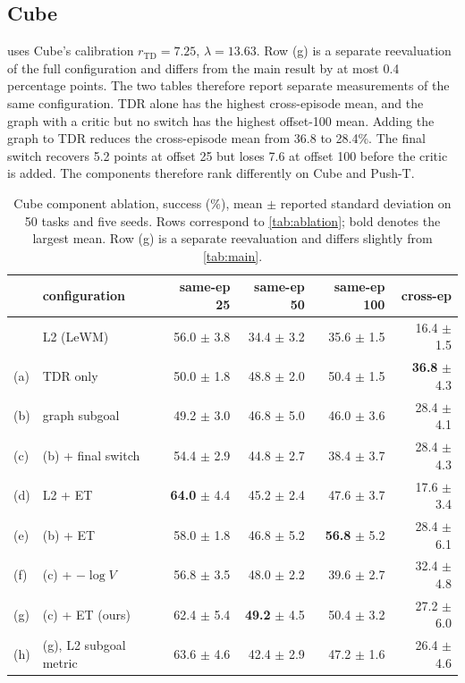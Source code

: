 \documentclass{article}
\newcommand{\Htd}{r_{\mathrm{TD}}}
\theoremstyle{definition}
\theoremstyle{remark}
\begin{document}
\subsection{Cube}
\label{app:ablation-cube}
 uses Cube's calibration
$\Htd=7.25$, $\lambda=13.63$. Row (g) is a separate reevaluation of the full
configuration and differs from the main result by at most 0.4 percentage points.
The two tables therefore report separate measurements of the same configuration.
TDR alone has the highest cross-episode mean, and the graph with a critic but no
switch has the highest offset-100 mean. Adding the graph to TDR reduces the
cross-episode mean from 36.8 to 28.4\%. The final switch recovers 5.2 points at
offset 25 but loses 7.6 at offset 100 before the critic is added.
The components therefore rank differently on Cube and Push-T.
\begin{table}[h]
\centering\small
\caption{Cube component ablation, success (\%), mean $\pm$ reported standard deviation on 50 tasks and five seeds. Rows correspond to \cref{tab:ablation}; bold denotes the largest mean. Row (g) is a separate reevaluation and differs slightly from \cref{tab:main}.}
\label{tab:ablation-cube}
\begin{tabular}{llrrrr}
\toprule
& configuration & same-ep 25 & same-ep 50 & same-ep 100 & cross-ep \\
\midrule
& L2 (LeWM) & 56.0 $\pm$ 3.8 & 34.4 $\pm$ 3.2 & 35.6 $\pm$ 1.5 & 16.4 $\pm$ 1.5 \\
(a) & TDR only & 50.0 $\pm$ 1.8 & 48.8 $\pm$ 2.0 & 50.4 $\pm$ 1.5 & \textbf{36.8} $\pm$ 4.3 \\
(b) & graph subgoal & 49.2 $\pm$ 3.0 & 46.8 $\pm$ 5.0 & 46.0 $\pm$ 3.6 & 28.4 $\pm$ 4.1 \\
(c) & (b) + final switch & 54.4 $\pm$ 2.9 & 44.8 $\pm$ 2.7 & 38.4 $\pm$ 3.7 & 28.4 $\pm$ 4.3 \\
\midrule
(d) & L2 + ET & \textbf{64.0} $\pm$ 4.4 & 45.2 $\pm$ 2.4 & 47.6 $\pm$ 3.7 & 17.6 $\pm$ 3.4 \\
(e) & (b) + ET & 58.0 $\pm$ 1.8 & 46.8 $\pm$ 5.2 & \textbf{56.8} $\pm$ 5.2 & 28.4 $\pm$ 6.1 \\
(f) & (c) + $-\log V$ & 56.8 $\pm$ 3.5 & 48.0 $\pm$ 2.2 & 39.6 $\pm$ 2.7 & 32.4 $\pm$ 4.8 \\
(g) & (c) + ET (ours) & 62.4 $\pm$ 5.4 & \textbf{49.2} $\pm$ 4.5 & 50.4 $\pm$ 3.2 & 27.2 $\pm$ 6.0 \\
(h) & (g), L2 subgoal metric & 63.6 $\pm$ 4.6 & 42.4 $\pm$ 2.9 & 47.2 $\pm$ 1.6 & 26.4 $\pm$ 4.6 \\
\bottomrule
\end{tabular}
\end{table}
\end{document}
